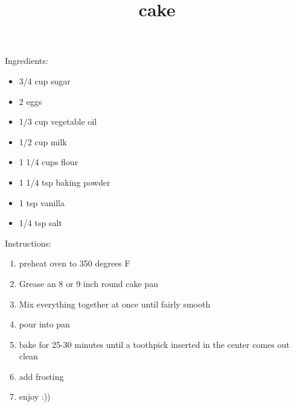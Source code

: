 \documentclass{article}
\begin{document}
\title{\Huge{}\selectfont
cake
}
\date{}
\maketitle

\begin{mdframed}
{\Large{}\selectfont
  Ingredients:}

\begin{itemize}
\item 3/4 cup sugar
\item 2 eggs
\item 1/3 cup vegetable oil
\item 1/2 cup milk
\item 1 1/4 cups flour
\item 1 1/4 tsp baking powder
\item 1 tsp vanilla
\item 1/4 tsp salt
\end{itemize}
\end{mdframed}
\begin{mdframed}
{\Large{}\selectfont
  Instructions:}

\begin{enumerate}
\item preheat oven to 350 degrees F
\item Grease an 8 or 9 inch round cake pan
\item Mix everything together at once until fairly smooth
\item pour into pan
\item bake for 25-30 minutes until a toothpick inserted in the center comes out clean
\item add frosting
\item enjoy :))
\end{enumerate}
\end{mdframed}
\end{document}
